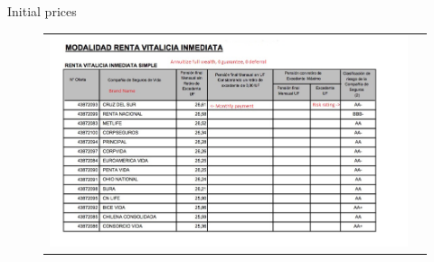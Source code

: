 \documentclass[10pt,aspectratio=169]{beamer}
\begin{document}
\begin{frame}{Initial prices}\label{slide:fig6}    
\begin{figure}[H]
\centering{}%
\begin{tabular}{cc}
\includegraphics[scale=0.49]{../figures/annuity_offer.png}
\end{tabular}
\end{figure}
\hyperlink{slide:setting}{} 
\hyperlink{slide:setting}{}
\end{frame}
\end{document}
